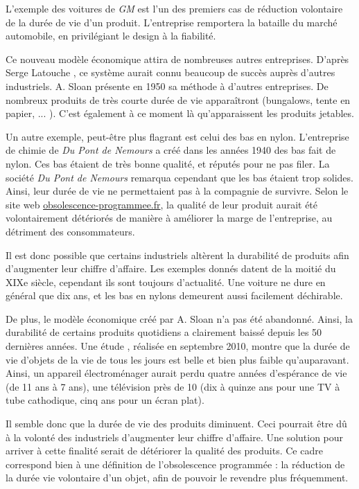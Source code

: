 \bigbreak

L'exemple des voitures de \textit{GM} est l'un des premiers cas de réduction volontaire de la durée de vie d'un produit. L'entreprise remportera la bataille du marché automobile, en privilégiant le design à la fiabilité.

Ce nouveau modèle économique attira de nombreuses autres entreprises. D'après Serge Latouche \cite{bpc}, ce système aurait connu beaucoup de succès auprès d'autres industriels. A. Sloan présente en 1950 sa méthode à d'autres entreprises. De nombreux produits de très courte durée de vie apparaîtront (bungalows, tente en papier, ... ). C'est également à ce moment là qu'apparaissent les produits jetables.
 
 
\bigbreak
Un autre exemple, peut-être plus flagrant est celui des bas en nylon.
L'entreprise de chimie de \textit{Du Pont de Nemours} a créé dans les années 1940 des bas fait de nylon.
Ces bas étaient de très bonne qualité, et réputés pour ne pas filer. La société \textit{Du Pont de Nemours} remarqua cependant que les bas étaient trop solides. 
Ainsi, leur durée de vie ne permettaient pas à la compagnie de survivre.
Selon le site web \url{obsolescence-programmee.fr},  la qualité de leur produit aurait été volontairement détériorés de manière à améliorer la marge de l'entreprise, au détriment des consommateurs. 

\bigbreak
Il est donc possible que certains industriels altèrent la durabilité de produits afin d'augmenter leur chiffre d'affaire. Les exemples donnés datent de la moitié du XIXe siècle, cependant ils sont toujours d'actualité. Une voiture ne dure en général que dix ans, et les bas en nylons demeurent aussi facilement déchirable. 

De plus, le modèle économique créé par A. Sloan n'a pas été abandonné. Ainsi, la durabilité de certains produits quotidiens a clairement baissé depuis les 50 dernières années. 
Une étude \cite{opSsg}, réalisée en septembre 2010, montre que la durée de vie d'objets de la vie de tous les jours est belle et bien plus faible qu'auparavant.
Ainsi, un appareil électroménager aurait perdu quatre années d'espérance de vie (de 11 ans à 7 ans), une télévision près de 10 (dix à quinze ans pour une TV à tube cathodique, cinq ans pour un écran plat). 

\bigbreak

Il semble donc que la durée de vie des produits diminuent. Ceci pourrait être dû à la volonté des industriels d'augmenter leur chiffre d'affaire. Une solution pour arriver à cette finalité serait de détériorer la qualité des produits. Ce cadre correspond  bien à une définition de l'obsolescence programmée : la réduction de la durée vie volontaire d'un objet, afin de pouvoir le revendre plus fréquemment. 
